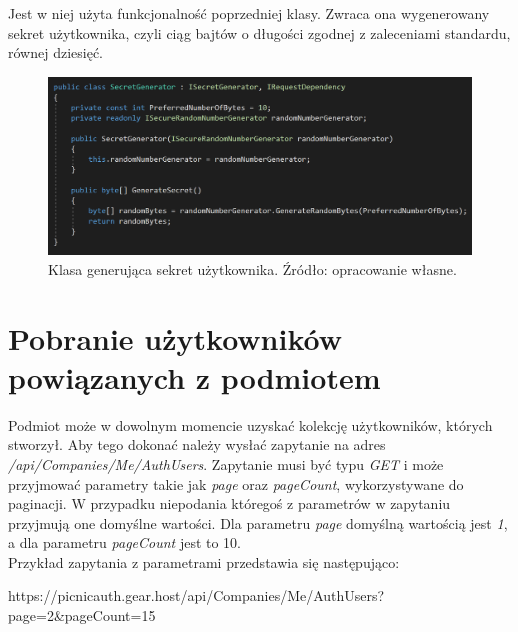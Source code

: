 Jest w niej użyta funkcjonalność poprzedniej klasy. Zwraca ona wygenerowany sekret użytkownika, czyli ciąg bajtów o długości
zgodnej z zaleceniami standardu, równej dziesięć.
\begin{figure}[t]
    \centering
	\includegraphics[width=\textwidth]{content/images/code-secretgenerator}
    \caption{Klasa generująca sekret użytkownika. Źródło: opracowanie własne.}
    \label{code-secretgenerator}
\end{figure}

\section{Pobranie użytkowników powiązanych z podmiotem}
Podmiot może w dowolnym momencie uzyskać kolekcję użytkowników, których stworzył. 
Aby tego dokonać należy wysłać zapytanie na adres \textit{/api/Companies/Me/AuthUsers}. 
Zapytanie musi być typu \textit{GET} i może przyjmować parametry takie jak \textit{page} oraz \textit{pageCount}, 
wykorzystywane do paginacji. 
W przypadku niepodania któregoś z parametrów w zapytaniu przyjmują one domyślne wartości. 
Dla parametru \textit{page} domyślną wartością jest \textit{1}, a dla parametru \textit{pageCount} jest to 10. \\
Przykład zapytania z parametrami przedstawia się następująco: \\
\centerline{https://picnicauth.gear.host/api/Companies/Me/AuthUsers?page=2\&pageCount=15}

